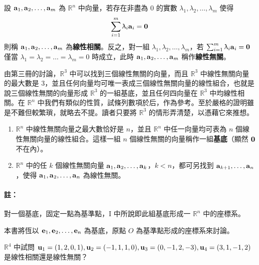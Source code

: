 \begin{definition}\label{def:b6-1-2}
設 $\boldsymbol{\mathbf{a}}_1, \boldsymbol{\mathbf{a}}_2, \dots, \boldsymbol{\mathbf{a}}_m$ 為 $\mathbb{R}^n$ 中向量，若存在非盡為 0 的實數 $\lambda_1, \lambda_2, \dots, \lambda_m$ 使得
\begin{equation}
\sum_{i=1}^m \uplambda_i \boldsymbol{\mathbf{a}}_i = \boldsymbol{\mathbf{0}} \label{eq:b6-1-1-8}
\end{equation}
則稱 $\boldsymbol{\mathbf{a}}_1, \boldsymbol{\mathbf{a}}_2, \dots, \boldsymbol{\mathbf{a}}_m$ 為\textbf{線性相關}。反之，對一組 $\lambda_1, \lambda_2, \dots, \lambda_m$，若 $\sum_{i=1}^m \uplambda_i \boldsymbol{\mathbf{a}}_i = \boldsymbol{\mathbf{0}}$ 僅當 $\lambda_1=\lambda_2=\dots=\lambda_m=0$ 時成立，此時 $\boldsymbol{\mathbf{a}}_1, \boldsymbol{\mathbf{a}}_2, \dots, \boldsymbol{\mathbf{a}}_m$ 稱作\textbf{線性無關}。
\end{definition}

由第三冊的討論，$\mathbb{R}^3$ 中可以找到三個線性無關的向量，而且 $\mathbb{R}^3$ 中線性無關向量的最大數是 3，並且任何向量均可唯一表成三個線性無關向量的線性組合，也就是說三個線性無關的向量形成 $\mathbb{R}^3$ 的一組基底，並且任何四向量在 $\mathbb{R}^3$ 中均線性相關。在 $\mathbb{R}^n$ 中我們有類似的性質，試條列數項於后，作為參考。至於嚴格的證明雖是不難但較繁瑣，就略去不提。讀者只要將 $\mathbb{R}^3$ 的情形弄清楚，以憑藉它來推想。
\begin{enumerate}[label=\Roman*., leftmargin=2.5em]
  \item $\mathbb{R}^n$ 中線性無關向量之最大數恰好是 $n$，並且 $\mathbb{R}^n$ 中任一向量均可表為 $n$ 個線性無關向量的線性組合。這樣一組 $n$ 個線性無關的向量稱作一組\textbf{基底}（顯然 $\boldsymbol{\mathbf{0}}$ 不在內）。
  \item $\mathbb{R}^n$ 中的任 $k$ 個線性無關向量 $\boldsymbol{\mathbf{a}}_1, \boldsymbol{\mathbf{a}}_2, \dots, \boldsymbol{\mathbf{a}}_k$，$k < n$，都可另找到 $\boldsymbol{\mathbf{a}}_{k+1}, \dots, \boldsymbol{\mathbf{a}}_n$，使得 $\boldsymbol{\mathbf{a}}_1, \boldsymbol{\mathbf{a}}_2, \dots, \boldsymbol{\mathbf{a}}_n$ 為線性無關。
\end{enumerate}

\paragraph{註：}對一個基底，固定一點為基準點，I 中所說即此組基底形成一 $\mathbb{R}^n$ 中的座標系。

本書將恆以 $\boldsymbol{\mathbf{e}}_1, \boldsymbol{\mathbf{e}}_2, \dots, \boldsymbol{\mathbf{e}}_n$ 為基底，原點 $O$ 為基準點形成的座標系來討論。

\begin{example}\label{ex:b6-1-5}
$\mathbb{R}^4$ 中試問 $\boldsymbol{\mathbf{u}}_1=(1, 2, 0, 1), \boldsymbol{\mathbf{u}}_2=(-1, 1, 1, 0), \boldsymbol{\mathbf{u}}_3=(0, -1, 2, -3), \boldsymbol{\mathbf{u}}_4=(3, 1, -1, 2)$ 是線性相關還是線性無關？
\end{example}

